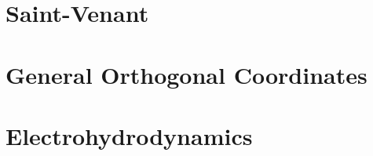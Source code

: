\documentclass[a4paper]{article}
\begin{document}






\section{Saint-Venant}




\section{General Orthogonal Coordinates}









\section{Electrohydrodynamics}










\end{document}
